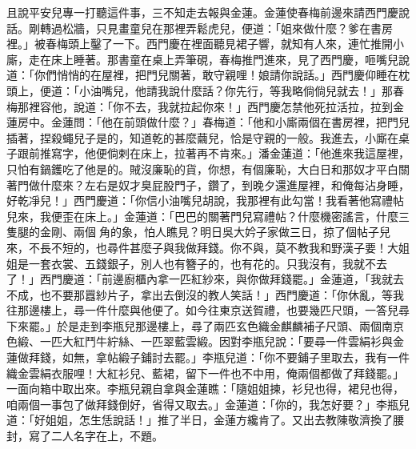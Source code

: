 且說平安兒專一打聽這件事，三不知走去報與金蓮。金蓮使春梅前邊來請西門慶說話。剛轉過松牆，只見畫童兒在那裡弄鬆虎兒，便道：「姐來做什麼？爹在書房裡。」被春梅頭上鑿了一下。西門慶在裡面聽見裙子響，就知有人來，連忙推開小廝，走在床上睡著。那書童在桌上弄筆硯，春梅推門進來，見了西門慶，咂嘴兒說道：「你們悄悄的在屋裡，把門兒關著，敢守親哩！娘請你說話。」西門慶仰睡在枕頭上，便道：「小油嘴兒，他請我說什麼話？你先行，等我略倘倘兒就去！」那春梅那裡容他，說道：「你不去，我就拉起你來！」西門慶怎禁他死拉活拉，拉到金蓮房中。金蓮問：「他在前頭做什麼？」春梅道：「他和小廝兩個在書房裡，把門兒插著，捏殺蠅兒子是的，知道乾的甚麼繭兒，恰是守親的一般。我進去，小廝在桌子跟前推寫字，他便倘剌在床上，拉著再不肯來。」潘金蓮道：「他進來我這屋裡，只怕有鍋鑊吃了他是的。賊沒廉恥的貨，你想，有個廉恥，大白日和那奴才平白關著門做什麼來？左右是奴才臭屁股門子，鑽了，到晚夕還進屋裡，和俺每沾身睡，好乾凈兒！」西門慶道：「你信小油嘴兒胡說，我那裡有此勾當！我看著他寫禮帖兒來，我便歪在床上。」金蓮道：「巴巴的關著門兒寫禮帖？什麼機密謠言，什麼三隻腿的金剛、兩個𧤀角的象，怕人瞧見？明日吳大妗子家做三日，掠了個帖子兒來，不長不短的，也尋件甚麼子與我做拜錢。你不與，莫不教我和野漢子要！大姐姐是一套衣裳、五錢銀子，別人也有簪子的，也有花的。只我沒有，我就不去了！」西門慶道：「前邊廚櫃內拿一匹紅紗來，與你做拜錢罷。」金蓮道，「我就去不成，也不要那囂紗片子，拿出去倒沒的教人笑話！」西門慶道：「你休亂，等我往那邊樓上，尋一件什麼與他便了。如今往東京送賀禮，也要幾匹尺頭，一答兒尋下來罷。」於是走到李瓶兒那邊樓上，尋了兩匹玄色織金麒麟補子尺頭、兩個南京色緞、一匹大紅鬥牛紵絲、一匹翠藍雲緞。因對李瓶兒說：「要尋一件雲絹衫與金蓮做拜錢，如無，拿帖緞子鋪討去罷。」李瓶兒道：「你不要鋪子里取去，我有一件織金雲絹衣服哩！大紅衫兒、藍裙，留下一件也不中用，俺兩個都做了拜錢罷。」一面向箱中取出來。李瓶兒親自拿與金蓮瞧：「隨姐姐揀，衫兒也得，裙兒也得，咱兩個一事包了做拜錢倒好，省得又取去。」金蓮道：「你的，我怎好要？」李瓶兒道：「好姐姐，怎生恁說話！」推了半日，金蓮方纔肯了。又出去教陳敬濟換了腰封，寫了二人名字在上，不題。

